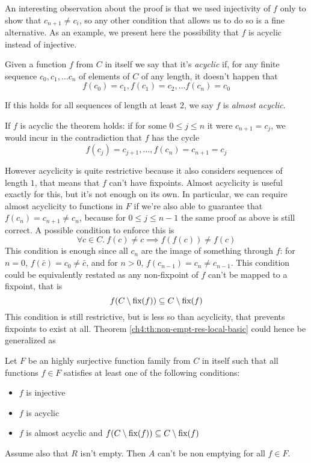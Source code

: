 An interesting observation about the proof is that we used injectivity of $f$ only to show that $c_{n+1} \neq c_i$, so any other condition that allows us to do so is a fine alternative. As an example, we present here the possibility that $f$ is acyclic instead of injective.
\begin{definition}
	Given a function $f$ from $C$ in itself we say that it's \textit{acyclic} if, for any finite sequence $c_0, c_1, \dots c_n$ of elements of $C$ of any length, it doesn't happen that
	\[
	f(c_0) = c_1, f(c_1) = c_2, \dots f(c_n) = c_0
	\]

	If this holds for all sequences of length at least $2$, we say $f$ is \textit{almost acyclic}.
\end{definition}
If $f$ is acyclic the theorem holds: if for some $0 \le j \le n$ it were $c_{n+1} = c_j$, we would incur in the contradiction that $f$ has the cycle
\[
f(c_j) = c_{j+1}, \dots, f(c_n) = c_{n+1} = c_j
\]

However acyclicity is quite restrictive because it also considers sequences of length $1$, that means that $f$ can't have fixpoints. Almost acyclicity is useful exactly for this, but it's not enough on its own.
In particular, we can require almost acyclicity to functions in $F$ if we're also able to guarantee that $f(c_n) = c_{n+1} \neq c_n$, because for $0 \le j \le n - 1$ the same proof as above is still correct. A possible condition to enforce this is
\[
\forall c \in C.\ f(c) \neq c \implies f(f(c)) \neq f(c)
\]
This condition is enough since all $c_n$ are the image of something through $f$: for $n = 0$, $f(\bar{c})= c_0 \neq \bar{c}$, and for $n > 0$, $f(c_{n-1}) = c_n \neq c_{n-1}$.
This condition could be equivalently restated as any non-fixpoint of $f$ can't be mapped to a fixpoint, that is
\[
f(C \setminus \text{fix}(f)) \subseteq C \setminus \text{fix}(f)
\]
This condition is still restrictive, but is less so than acyclicity, that prevents fixpoints to exist at all.
Theorem \ref{ch4:th:non-empt-res-local-basic} could hence be generalized as
\begin{theorem}\label{ch4:th:non-empt-res-local}
	Let $F$ be an highly surjective function family from $C$ in itself such that all functions $f \in F$ satisfies at least one of the following conditions:
	\begin{itemize}
		\item $f$ is injective
		\item $f$ is acyclic
		\item $f$ is almost acyclic and $f(C \setminus \text{fix}(f)) \subseteq C \setminus \text{fix}(f)$
	\end{itemize}
	Assume also that $R$ isn't empty. Then $A$ can't be non emptying for all $f \in F$.
\end{theorem}

